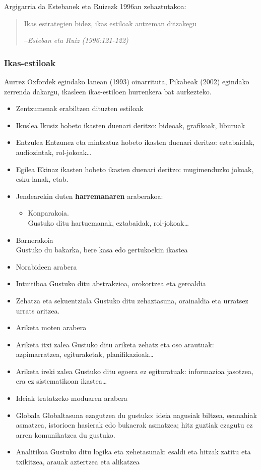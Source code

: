 \documentclass[
]{book}
\providecommand{\tightlist}{%
  \setlength{\itemsep}{0pt}\setlength{\parskip}{0pt}}
\begin{document}
Argigarria da Estebanek eta Ruizezk 1996an zehaztutakoa:

\begin{quote}
Ikas estrategien bidez, ikas estiloak antzeman ditzakegu

--\emph{Esteban eta Ruiz (1996:121-122)}
\end{quote}

\hypertarget{ikas-estiloak-1}{%
\subsubsection{Ikas-estiloak}\label{ikas-estiloak-1}}

Aurrez Oxfordek egindako lanean (1993) oinarrituta, Pikabeak (2002) egindako zerrenda dakargu, ikasleen ikas-estiloen hurrenkera bat aurkezteko.

\begin{itemize}
\tightlist
\item
  Zentzumenak erabiltzen dituzten estiloak
\item
  Ikuslea
  Ikusiz hobeto ikasten duenari deritzo: bideoak, grafikoak, liburuak
\item
  Entzulea
  Entzunez eta mintzatuz hobeto ikasten duenari deritzo: eztabaidak, audiozintak, rol-jokoak\ldots{}
\item
  Egilea
  Ekinaz ikasten hobeto ikasten duenari deritzo: mugimenduzko jokoak, esku-lanak, etab.
\item
  Jendearekin duten \textbf{harremanaren} araberakoa:

  \begin{itemize}
  \tightlist
  \item
    Konparakoia.\\
    Gustuko ditu hartuemanak, eztabaidak, rol-jokoak\ldots{}
  \end{itemize}
\item
  Barnerakoia\\
  Gustuko du bakarka, bere kasa edo gertukoekin ikastea
\item
  Norabideen arabera
\item
  Intuitiboa
  Gustuko ditu abstrakzioa, orokortzea eta geroaldia
\item
  Zehatza eta sekuentziala
  Gustuko ditu zehaztasuna, orainaldia eta urratsez urrats aritzea.
\item
  Ariketa moten arabera
\item
  Ariketa itxi zalea
  Gustuko ditu ariketa zehatz eta oso arautuak: azpimarratzea, egituraketak, planifikazioak\ldots{}
\item
  Ariketa ireki zalea
  Gustuko ditu egoera ez egituratuak: informazioa jasotzea, era ez sistematikoan ikastea\ldots{}
\item
  Ideiak tratatzeko moduaren arabera
\item
  Globala
  Globaltasuna ezagutzea du gustuko: ideia nagusiak biltzea, esanahiak asmatzea, istorioen hasierak edo bukaerak asmatzea; hitz guztiak ezagutu ez arren komunikatzea du gustuko.
\item
  Analitikoa
  Gustuko ditu logika eta xehetasunak: esaldi eta hitzak zatitu eta txikitzea, arauak aztertzea eta alikatzea
\end{itemize}
\end{document}

